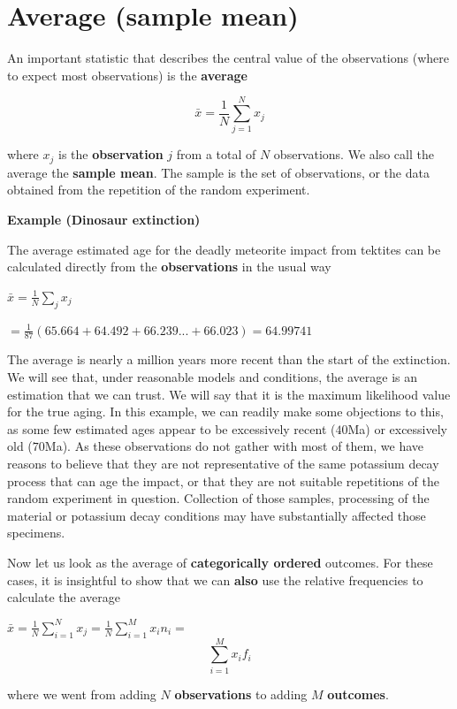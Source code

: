 \documentclass[
]{book}
\begin{document}
\hypertarget{average-sample-mean}{%
\section{Average (sample mean)}\label{average-sample-mean}}

An important statistic that describes the central value of the observations (where to expect most observations) is the \textbf{average}

\[\bar{x}=\frac{1}{N} \sum_{j=1}^N x_j\]

where \(x_j\) is the \textbf{observation} \(j\) from a total of \(N\) observations. We also call the average the \textbf{sample mean}. The sample is the set of observations, or the data obtained from the repetition of the random experiment.

\textbf{Example (Dinosaur extinction)}

The average estimated age for the deadly meteorite impact from tektites can be calculated directly from the \textbf{observations} in the usual way

\(\bar{x}= \frac{1}{ N}\sum_j x_j\)

\(= \frac{1}{87}(65.664 + 64.492 + 66.239... + 66.023) = 64.99741\)

The average is nearly a million years more recent than the start of the extinction. We will see that, under reasonable models and conditions, the average is an estimation that we can trust. We will say that it is the maximum likelihood value for the true aging. In this example, we can readily make some objections to this, as some few estimated ages appear to be excessively recent (\(40\)Ma) or excessively old (\(70\)Ma). As these observations do not gather with most of them, we have reasons to believe that they are not representative of the same potassium decay process that can age the impact, or that they are not suitable repetitions of the random experiment in question. Collection of those samples, processing of the material or potassium decay conditions may have substantially affected those specimens.

Now let us look as the average of \textbf{categorically ordered} outcomes. For these cases, it is insightful to show that we can \textbf{also} use the relative frequencies to calculate the average

\(\bar{x}=\frac{1}{ N}\sum_{i=1}^N x_j =\frac{1}{N}\sum_{i=1}^M x_i n_ {i}=\)
\[\sum_{i=1}^M x_i f_{i}\]

where we went from adding \(N\) \textbf{observations} to adding \(M\) \textbf{outcomes}.
\end{document}
